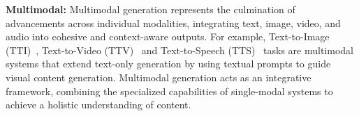 \textbf{Multimodal:}
Multimodal generation represents the culmination of advancements across individual modalities, integrating text, image, video, and audio into cohesive and context-aware outputs. For example, 
Text-to-Image (TTI)~\cite{rombach2022high, deepmind2023imagen2, midjourney2023, bai2023qwen, liu2024visual, zhu2023minigpt}, Text-to-Video (TTV)~\cite{singer2022make,openai2023dalle2,brooks2024video, deepmind2023veo, blattmann2023stable} and Text-to-Speech (TTS)~\cite{ghosal2023text, liu2023wavjourney, yang2023uniaudio} tasks are multimodal systems that extend text-only generation by using textual prompts to guide visual content generation. Multimodal generation acts as an integrative framework, combining the specialized capabilities of single-modal systems to achieve a holistic understanding of content.


